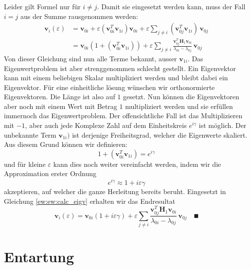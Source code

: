 Leider gilt Formel  nur für $i \neq j$. Damit sie eingesetzt werden kann, muss der Fall $i = j$ aus der Summe rausgenommen werden:
\begin{align}
    \bm v_i(\varepsilon)
    &=
    \bm v_{0i} + \varepsilon \left( \bm v_{0i}^T \bm v_{1i} \right) \bm v_{0i} + \varepsilon \sum_{j \neq i} \left(\bm v_{0j}^T \bm v_{1i} \right) \, \bm v_{0j} \\
    &=
    \bm v_{0i} \left( 1 + (\bm v_{0i}^T \bm v_{1i}) \right) + \varepsilon \sum_{j \neq i}
    \frac{\bm v_{0j}^T \bm H_1 \bm v_{0i}}{\lambda_{0i} - \lambda_{0j}}
    \, \bm v_{0j} \label{ew:ew:calc_eigv}
\end{align}
Von dieser Gleichung sind nun alle Terme bekannt, ausser $\bm v_{1i}$.
Das Eigenwertproblem ist aber strenggenommen schlecht gestellt.
Ein Eigenvektor kann mit einem beliebigen Skalar multipliziert werden und bleibt dabei ein Eigenvektor.
Für eine einheitliche lösung wünschen wir orthonormierte Eigenvektoren.
Die Länge ist also auf $1$ gesetzt.
Nun können die Eigenvektoren aber noch mit einem Wert mit Betrag $1$ multipliziert werden und sie erfüllen immernoch das Eigenwertproblem.
Der offensichtliche Fall ist das Multiplizieren mit $-1$, aber auch jede Komplexe Zahl auf dem Einheitskreis $e^{i\gamma}$ ist möglich.
Der unbekannte Term $\bm v_{1i})$ ist derjenige Freiheitsgrad, welcher die Eigenwerte skaliert.
Aus diesem Grund können wir definieren:
\begin{equation}
    1 + (\bm v_{0i}^T \bm v_{1i}) = e^{i\gamma}
\end{equation}
und für kleine $\varepsilon$ kann dies noch weiter vereinfacht werden, indem wir die Approximation erster Ordnung
\begin{equation}
    e^{i\gamma} \approx 1 + i \varepsilon \gamma
\end{equation}
akzeptieren, auf welcher die ganze Herleitung bereits beruht.
Eingesetzt in Gleichung \eqref{ew:ew:calc_eigv} erhalten wir das Endresultat
\begin{equation}
    \bm v_i(\varepsilon)
    =
    \bm v_{0i} \left( 1 + i \varepsilon \gamma \right) + \varepsilon \sum_{j \neq i}
    \frac{\bm v_{0j}^T \bm H_1 \bm v_{0i}}{\lambda_{0i} - \lambda_{0j}}
    \, \bm v_{0j}
    \quad
    \QED
    \label{ew:eq:explicit_eigvecs}
\end{equation}

\section{Entartung}

